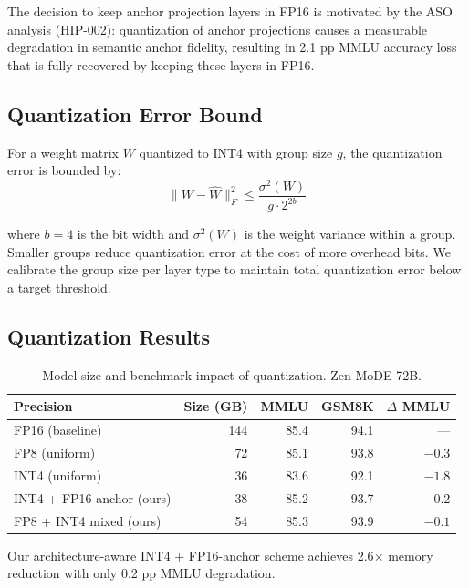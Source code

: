\documentclass[11pt,a4paper]{article}
\begin{document}
The decision to keep anchor projection layers in FP16 is motivated by the ASO analysis
(HIP-002): quantization of anchor projections causes a measurable degradation in
semantic anchor fidelity, resulting in 2.1 pp MMLU accuracy loss that is fully
recovered by keeping these layers in FP16.

\subsection{Quantization Error Bound}

For a weight matrix $W$ quantized to INT4 with group size $g$, the quantization error
is bounded by:
\begin{equation}
    \|W - \hat{W}\|_F^2 \leq \frac{\sigma^2(W)}{g \cdot 2^{2b}}
    \label{eq:quant_error}
\end{equation}

where $b = 4$ is the bit width and $\sigma^2(W)$ is the weight variance within a group.
Smaller groups reduce quantization error at the cost of more overhead bits. We calibrate
the group size per layer type to maintain total quantization error below a target threshold.

\subsection{Quantization Results}

\begin{table}[H]
\centering
\caption{Model size and benchmark impact of quantization. Zen MoDE-72B.}
\begin{tabular}{lrrrr}
\toprule
\textbf{Precision} & \textbf{Size (GB)} & \textbf{MMLU} & \textbf{GSM8K} & \textbf{$\Delta$ MMLU} \\
\midrule
FP16 (baseline)            & 144 & 85.4 & 94.1 & --- \\
FP8 (uniform)              & 72  & 85.1 & 93.8 & $-0.3$ \\
INT4 (uniform)             & 36  & 83.6 & 92.1 & $-1.8$ \\
INT4 + FP16 anchor (ours)  & 38  & 85.2 & 93.7 & $-0.2$ \\
FP8 + INT4 mixed (ours)    & 54  & 85.3 & 93.9 & $-0.1$ \\
\bottomrule
\end{tabular}
\label{tab:quantization}
\end{table}

Our architecture-aware INT4 + FP16-anchor scheme achieves 2.6$\times$ memory reduction
with only 0.2 pp MMLU degradation.
\end{document}
